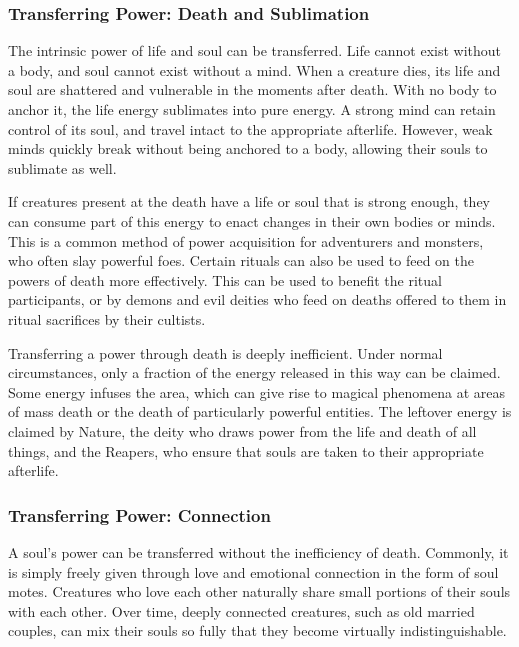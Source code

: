     \subsubsection{Transferring Power: Death and Sublimation}
      The intrinsic power of life and soul can be transferred.
      Life cannot exist without a body, and soul cannot exist without a mind.
      When a creature dies, its life and soul are shattered and vulnerable in the moments after death.
      With no body to anchor it, the life energy sublimates into pure energy.
      A strong mind can retain control of its soul, and travel intact to the appropriate afterlife.
      However, weak minds quickly break without being anchored to a body, allowing their souls to sublimate as well.

      If creatures present at the death have a life or soul that is strong enough, they can consume part of this energy to enact changes in their own bodies or minds.
      This is a common method of power acquisition for adventurers and monsters, who often slay powerful foes.
      Certain rituals can also be used to feed on the powers of death more effectively.
      This can be used to benefit the ritual participants, or by demons and evil deities who feed on deaths offered to them in ritual sacrifices by their cultists.

      Transferring a power through death is deeply inefficient.
      Under normal circumstances, only a fraction of the energy released in this way can be claimed.
      Some energy infuses the area, which can give rise to magical phenomena at areas of mass death or the death of particularly powerful entities.
      The leftover energy is claimed by Nature, the deity who draws power from the life and death of all things, and the Reapers, who ensure that souls are taken to their appropriate afterlife.

    \subsubsection{Transferring Power: Connection}
      A soul's power can be transferred without the inefficiency of death.
      Commonly, it is simply freely given through love and emotional connection in the form of soul motes.
      Creatures who love each other naturally share small portions of their souls with each other.
      Over time, deeply connected creatures, such as old married couples, can mix their souls so fully that they become virtually indistinguishable.

